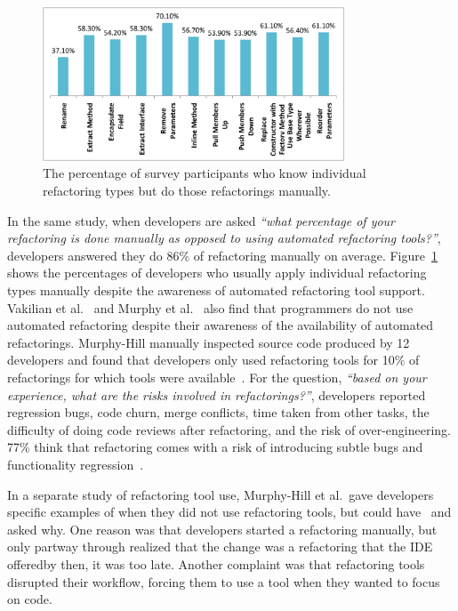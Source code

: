\begin{figure}[!htb]
\centering
    \includegraphics[width=0.8\textwidth]{images/manualRefactoring.pdf}
    \caption{The percentage of survey participants who know individual refactoring types but do those refactorings manually.\cite{Kim2014:EmpiricalStudy}}  
\label{fig:manualRefactoring} 
\end{figure} 

In the same study, when developers are asked {\it ``what percentage of your refactoring is done manually as opposed to using automated refactoring tools?''}, developers answered they do 86\% of refactoring manually on average. Figure~\ref{fig:manualRefactoring} shows the percentages of developers who usually apply individual refactoring types manually despite the awareness of automated refactoring tool support. Vakilian et al.~\cite{Vakilian:2012} and Murphy et al.~\cite{Murphy2006:JSD} also find that programmers do not use automated refactoring despite their awareness of the availability of automated refactorings. Murphy-Hill manually inspected source code produced by 12 developers and found that developers only used refactoring tools for 10\% of refactorings for which tools were available~\cite{Murphy-Hill2012:refactor}. For the question, {\it ``based on your experience, what are the risks involved in refactorings?''}, developers reported regression bugs, code churn, merge conflicts, time taken from other tasks, the difficulty of doing code reviews after refactoring, and the risk of over-engineering. 77\% think that refactoring comes with a risk of introducing subtle bugs and functionality regression~\cite{Kim2012:FSR}.

In a separate study of refactoring tool use, Murphy-Hill et al.~gave developers specific examples of when they did not use refactoring tools, but could have~\cite{Murphy-Hill2012:refactor} and asked why. One reason was that developers started a refactoring manually, but only partway through realized that the change was a refactoring that the IDE offered\textemdash by then, it was too late.  Another complaint was that refactoring tools disrupted their workflow, forcing them to use a tool when they wanted to focus on code.  

